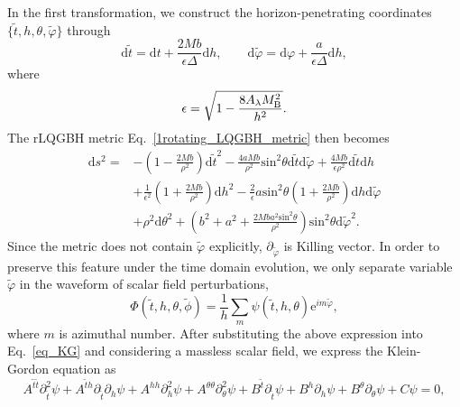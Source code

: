 \documentclass[12pt]{article}
\begin{document}
In the first transformation, we construct the horizon-penetrating coordinates $\{\tilde t, h,\theta, \tilde \varphi\} $ through 
    \begin{equation}\label{eq:trans_hp}
    	\mathrm d \tilde t=\mathrm d t+ \frac{2Mb}{\epsilon\Delta}\mathrm dh,\qquad
    	\mathrm d \tilde \varphi=\mathrm d \varphi+\frac a {\epsilon\Delta}\mathrm dh,
    \end{equation}
where
\begin{equation}\label{eq:defepsilon}
\epsilon=\sqrt{1-\frac{8A_\lambda M_{\rm B}^2}{h^2}}.
\end{equation}
The rLQGBH metric Eq.~\eqref{1rotating_LQGBH_metric} then becomes 
    \begin{equation}
    	\begin{split}
    		\mathrm ds^2=&-\left(1-\frac{2Mb}{\rho^2}\right)\mathrm d \tilde t^2
    		-\frac{4aMb}{\rho^2}\mathrm{sin}^2\theta\mathrm d\tilde t \mathrm d \tilde \varphi+\frac{4Mb}{\epsilon \rho^2}\mathrm d\tilde t\mathrm d h\\
    		&
    		+\frac 1{\epsilon^2}\left(1+ \frac{2Mb}{\rho^2}\right) \mathrm d h^2
    		-\frac 2\epsilon a\mathrm{sin}^2\theta\left( 1+\frac{2Mb}{\rho^2}\right) \mathrm d h \mathrm d \tilde \varphi\\
    		&+\rho^2\mathrm d\theta^2
    		+\left(b^2+a^2+\frac{2Mba^2\mathrm{sin}^2\theta}{\rho^2} \right)\mathrm{sin}^2\theta\mathrm d\tilde\varphi^2.
    	\end{split}
    \end{equation}
Since the metric does not contain $\tilde \varphi$ explicitly,  $\partial_{\tilde \varphi}$ is Killing vector. 
In order to preserve this feature under the time domain evolution, we only separate variable $\tilde{\varphi}$ in the waveform of scalar field perturbations, 
    \begin{equation}
    	\Phi(\tilde t, h, \theta, \tilde \phi)=\frac 1h \sum_{m}\psi(\tilde t,h ,\theta)\mathrm e^{im\tilde\varphi},
    \end{equation}
where $m$ is azimuthal number. After substituting the above expression into Eq.~\eqref{eq_KG} and considering a massless scalar field, we express the Klein-Gordon equation as
\begin{equation}\label{eq:KG-hp}
    	A^{\tilde t\tilde t}\partial^2_{\tilde t}\psi
    	+A^{\tilde t h}\partial_{\tilde t}\partial_h\psi
    	+A^{hh}\partial^2_h\psi
    	+A^{\theta\theta}\partial^2_\theta\psi
    	+B^{\tilde t}\partial_{\tilde t}\psi
    	+B^h\partial_h\psi
    	+B^\theta\partial_\theta\psi
    	+C\psi
    	=0,
\end{equation}
\end{document}
